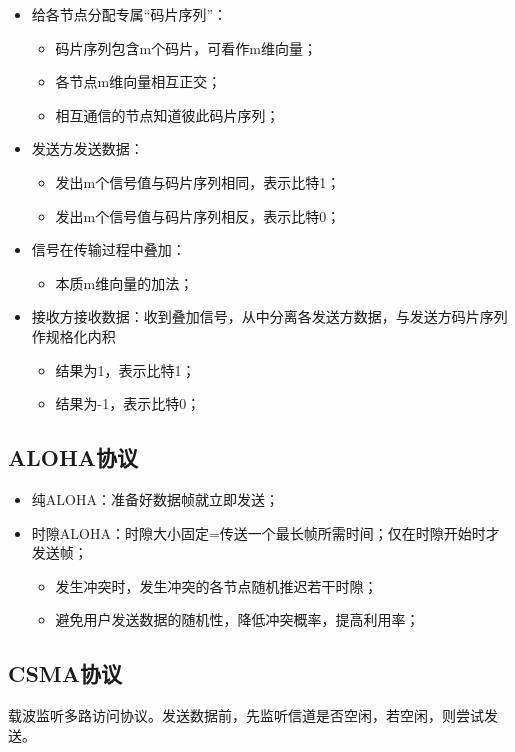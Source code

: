 \begin{itemize}
    \item 给各节点分配专属“码片序列”：\begin{itemize}
        \item 码片序列包含m个码片，可看作m维向量；
        \item 各节点m维向量相互正交；
        \item 相互通信的节点知道彼此码片序列；
    \end{itemize}
    \item 发送方发送数据：\begin{itemize}
        \item 发出m个信号值与码片序列相同，表示比特1；
        \item 发出m个信号值与码片序列相反，表示比特0；
    \end{itemize}
    \item 信号在传输过程中叠加：\begin{itemize}
        \item 本质m维向量的加法；
    \end{itemize}
    \item 接收方接收数据：收到叠加信号，从中分离各发送方数据，与发送方码片序列作规格化内积\begin{itemize}
        \item 结果为1，表示比特1；
        \item 结果为-1，表示比特0；
    \end{itemize}
\end{itemize}


\subsection{ALOHA协议}
\begin{itemize}
    \item 纯ALOHA：准备好数据帧就立即发送；
    \item 时隙ALOHA：时隙大小固定=传送一个最长帧所需时间；仅在时隙开始时才发送帧；\begin{itemize}
        \item 发生冲突时，发生冲突的各节点随机推迟若干时隙；
        \item 避免用户发送数据的随机性，降低冲突概率，提高利用率；
    \end{itemize}
\end{itemize}


\subsection{CSMA协议}
载波监听多路访问协议。发送数据前，先监听信道是否空闲，若空闲，则尝试发送。

